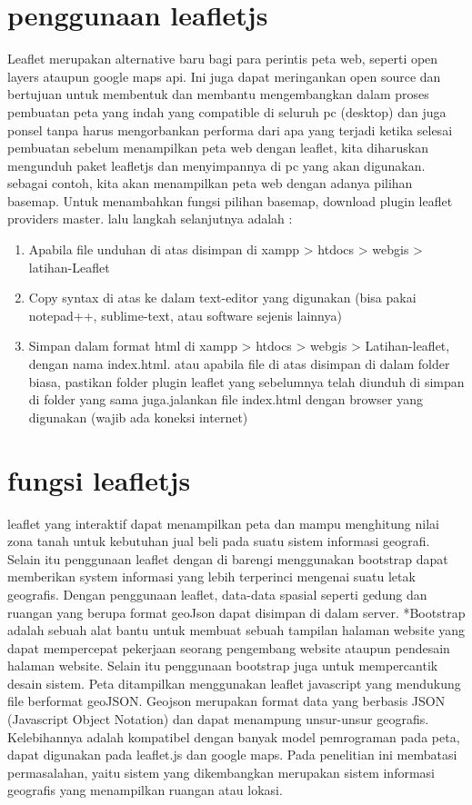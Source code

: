 \section{penggunaan leafletjs}
Leaflet merupakan alternative baru bagi para perintis peta web, seperti open layers ataupun google maps api. Ini juga dapat meringankan open source dan bertujuan untuk membentuk dan membantu mengembangkan dalam proses pembuatan peta yang indah yang compatible di seluruh pc (desktop) dan juga ponsel tanpa harus mengorbankan performa dari apa yang terjadi ketika selesai pembuatan
sebelum menampilkan peta web dengan leaflet, kita diharuskan mengunduh paket leafletjs dan menyimpannya di pc yang akan digunakan. 
sebagai contoh, kita akan menampilkan peta web dengan adanya pilihan basemap. Untuk menambahkan fungsi pilihan basemap, download plugin leaflet providers master. lalu langkah selanjutnya adalah :
\begin{enumerate}
\item Apabila file unduhan di atas disimpan di xampp > htdocs > webgis > latihan-Leaflet
\item Copy syntax di atas ke dalam text-editor yang digunakan (bisa pakai notepad++, sublime-text, atau software sejenis lainnya)
\item Simpan dalam format html di xampp > htdocs > webgis > Latihan-leaflet, dengan nama index.html. atau apabila file di atas disimpan di dalam folder biasa, pastikan folder plugin leaflet yang sebelumnya telah diunduh di simpan di folder yang sama juga.jalankan file index.html dengan browser yang digunakan (wajib ada koneksi internet)
\end{enumerate}
\section{fungsi leafletjs}
leaflet yang interaktif dapat menampilkan peta dan mampu menghitung nilai zona tanah untuk kebutuhan jual beli pada suatu sistem informasi geografi. Selain itu penggunaan leaflet dengan di barengi menggunakan bootstrap dapat memberikan system informasi yang lebih terperinci mengenai suatu letak geografis. Dengan penggunaan leaflet, data-data spasial seperti gedung dan ruangan yang berupa format geoJson dapat disimpan di dalam server. 
*Bootstrap adalah sebuah alat bantu untuk membuat sebuah tampilan halaman  website yang dapat mempercepat pekerjaan seorang pengembang website ataupun pendesain halaman website. Selain itu penggunaan bootstrap juga untuk mempercantik desain sistem. Peta ditampilkan menggunakan leaflet javascript yang mendukung file berformat geoJSON. Geojson merupakan format data yang berbasis JSON (Javascript Object Notation) dan dapat menampung unsur-unsur geografis. Kelebihannya adalah kompatibel dengan banyak model pemrograman pada peta, dapat digunakan pada leaflet.js dan google maps. Pada penelitian ini membatasi permasalahan, yaitu sistem yang dikembangkan merupakan sistem informasi geografis yang menampilkan ruangan atau lokasi.

